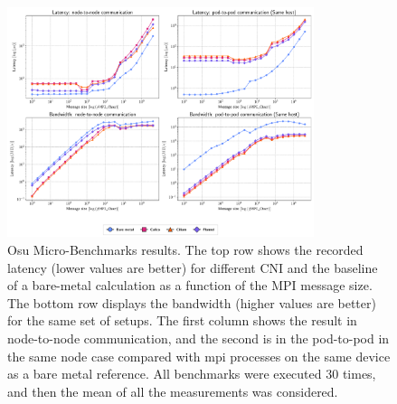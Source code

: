 \begin{figure}
  \centering
  \includegraphics[width=0.8\textwidth]{img/abstract/summary-osu}
  \caption{Osu Micro-Benchmarks results. The top row shows the recorded latency
    (lower values are better) for different CNI and the baseline of a bare-metal
    calculation as a function of the MPI message size. The bottom row displays
    the bandwidth (higher values are better) for the same set of setups. The
    first column shows the result in node-to-node communication, and the second
    is in the pod-to-pod in the same node case compared with mpi processes on
    the same device as a bare metal reference. All benchmarks were executed 30
    times, and then the mean of all the measurements was considered.}
  \label{fig:summary-osu_en}
\end{figure}

